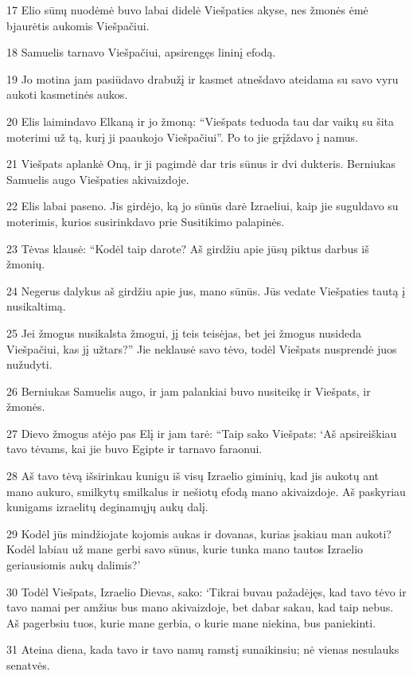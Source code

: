 \par 17 Elio sūnų nuodėmė buvo labai didelė Viešpaties akyse, nes žmonės ėmė bjaurėtis aukomis Viešpačiui. 
\par 18 Samuelis tarnavo Viešpačiui, apsirengęs lininį efodą. 
\par 19 Jo motina jam pasiūdavo drabužį ir kasmet atnešdavo ateidama su savo vyru aukoti kasmetinės aukos. 
\par 20 Elis laimindavo Elkaną ir jo žmoną: “Viešpats teduoda tau dar vaikų su šita moterimi už tą, kurį ji paaukojo Viešpačiui”. Po to jie grįždavo į namus. 
\par 21 Viešpats aplankė Oną, ir ji pagimdė dar tris sūnus ir dvi dukteris. Berniukas Samuelis augo Viešpaties akivaizdoje. 
\par 22 Elis labai paseno. Jis girdėjo, ką jo sūnūs darė Izraeliui, kaip jie suguldavo su moterimis, kurios susirinkdavo prie Susitikimo palapinės. 
\par 23 Tėvas klausė: “Kodėl taip darote? Aš girdžiu apie jūsų piktus darbus iš žmonių. 
\par 24 Negerus dalykus aš girdžiu apie jus, mano sūnūs. Jūs vedate Viešpaties tautą į nusikaltimą. 
\par 25 Jei žmogus nusikalsta žmogui, jį teis teisėjas, bet jei žmogus nusideda Viešpačiui, kas jį užtars?” Jie neklausė savo tėvo, todėl Viešpats nusprendė juos nužudyti. 
\par 26 Berniukas Samuelis augo, ir jam palankiai buvo nusiteikę ir Viešpats, ir žmonės. 
\par 27 Dievo žmogus atėjo pas Elį ir jam tarė: “Taip sako Viešpats: ‘Aš apsireiškiau tavo tėvams, kai jie buvo Egipte ir tarnavo faraonui. 
\par 28 Aš tavo tėvą išsirinkau kunigu iš visų Izraelio giminių, kad jis aukotų ant mano aukuro, smilkytų smilkalus ir nešiotų efodą mano akivaizdoje. Aš paskyriau kunigams izraelitų deginamųjų aukų dalį. 
\par 29 Kodėl jūs mindžiojate kojomis aukas ir dovanas, kurias įsakiau man aukoti? Kodėl labiau už mane gerbi savo sūnus, kurie tunka mano tautos Izraelio geriausiomis aukų dalimis?’ 
\par 30 Todėl Viešpats, Izraelio Dievas, sako: ‘Tikrai buvau pažadėjęs, kad tavo tėvo ir tavo namai per amžius bus mano akivaizdoje, bet dabar sakau, kad taip nebus. Aš pagerbsiu tuos, kurie mane gerbia, o kurie mane niekina, bus paniekinti. 
\par 31 Ateina diena, kada tavo ir tavo namų ramstį sunaikinsiu; nė vienas nesulauks senatvės. 
